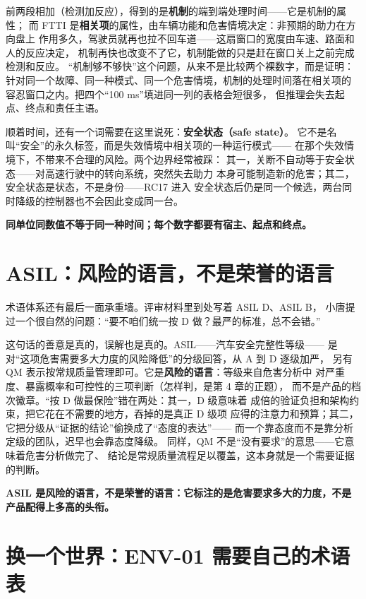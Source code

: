 前两段相加（检测加反应），得到的是\textbf{机制}的端到端处理时间——它是机制的属性；
而 FTTI 是\textbf{相关项}的属性，由车辆功能和危害情境决定：非预期的助力在方向盘上
作用多久，驾驶员就再也拉不回车道——这扇窗口的宽度由车速、路面和人的反应决定，
机制再快也改变不了它，机制能做的只是赶在窗口关上之前完成检测和反应。
“机制够不够快”这个问题，从来不是比较两个裸数字，而是证明：
针对同一个故障、同一种模式、同一个危害情境，机制的处理时间落在相关项的
容忍窗口之内。把四个“100 ms”填进同一列的表格会短很多，
但推理会失去起点、终点和责任主语。

顺着时间，还有一个词需要在这里说死：\textbf{安全状态（safe state）}。
它不是名叫“安全”的永久标签，而是失效情境中相关项的一种运行模式——
在那个失效情境下，不带来不合理的风险。两个边界经常被踩：
其一，关断不自动等于安全状态——对高速行驶中的转向系统，突然失去助力
本身可能制造新的危害；其二，安全状态是状态，不是身份——RC17 进入
安全状态后仍是同一个候选，两台同时降级的控制器也不会因此变成同一台。

\textbf{同单位同数值不等于同一种时间；每个数字都要有宿主、起点和终点。}

\section{ASIL：风险的语言，不是荣誉的语言}

术语体系还有最后一面承重墙。评审材料里到处写着 ASIL D、ASIL B，
小唐提过一个很自然的问题：“要不咱们统一按 D 做？最严的标准，总不会错。”

这句话的善意是真的，误解也是真的。ASIL——汽车安全完整性等级——
是对“这项危害需要多大力度的风险降低”的分级回答，从 A 到 D 逐级加严，
另有 QM 表示按常规质量管理即可。它是\textbf{风险的语言}：等级来自危害分析中
对严重度、暴露概率和可控性的三项判断（怎样判，是第 4 章的正题），
而不是产品的档次徽章。“按 D 做最保险”错在两处：其一，D 级意味着
成倍的验证负担和架构约束，把它花在不需要的地方，吞掉的是真正 D 级项
应得的注意力和预算；其二，它把分级从“证据的结论”偷换成了“态度的表达”——
而一个靠态度而不是靠分析定级的团队，迟早也会靠态度降级。
同样，QM 不是“没有要求”的意思——它意味着危害分析做完了、
结论是常规质量流程足以覆盖，这本身就是一个需要证据的判断。

\textbf{ASIL 是风险的语言，不是荣誉的语言：它标注的是危害要求多大的力度，不是产品配得上多高的头衔。}

\section{换一个世界：ENV-01 需要自己的术语表}

